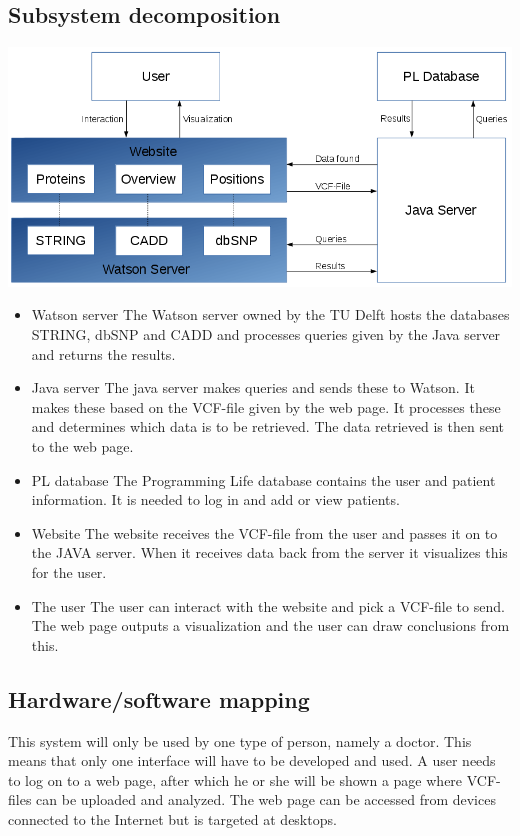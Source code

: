 	\subsection{Subsystem decomposition}
		\includegraphics[scale=0.5]{schema1-improvedv2.png}
		\begin{itemize}
			\item Watson server
				\subitem The Watson server owned by the TU Delft hosts the databases STRING\cite{franceschini2013string}, dbSNP\cite{sherry2001dbsnp} and CADD\cite{kircher2014general} and processes queries given by the Java server and returns the results.
			\item Java server
				\subitem The java server makes queries and sends these to Watson. It makes these based on the VCF-file given by the web page. It processes these and determines which data is to be retrieved. The data retrieved is then sent to the web page.
			\item PL database
				\subitem The Programming Life database contains the user and patient information. It is needed to log in and add or view patients.
			\item Website
				\subitem The website receives the VCF-file from the user and passes it on to the JAVA server. When it receives data back from the server it visualizes this for the user.
			\item The user 
				\subitem The user can interact with the website and pick a VCF-file to send. The web page outputs a visualization and the user can draw conclusions from this.
		\end{itemize}
	\subsection{Hardware/software mapping}
		This system will only be used by one type of person, namely a doctor. This means that only one interface will have to be developed and used. A user needs to log on to a web page, after which he or she will be shown a page where VCF-files can be uploaded and analyzed. The web page can be accessed from devices connected to the Internet but is targeted at desktops.
